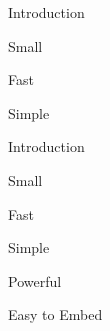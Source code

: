
\begin{itemslide}{Introduction}
\pause \item Small
\pause \item Fast
\pause \item Simple
\end{itemslide}


\begin{itemslide}{Introduction}
\item Small
\item Fast
\item Simple
\item Powerful
\pause \item Easy to Embed
\end{itemslide}
